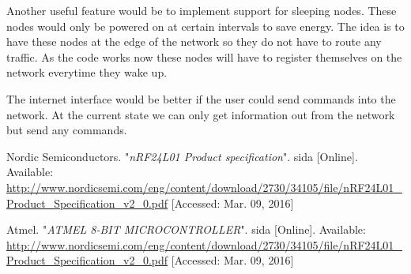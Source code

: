 \documentclass[a4paper,11pt]{article}
\begin{document}
Another useful feature would be to implement support for sleeping 
nodes. These nodes would only be powered on at certain intervals to
save energy. The idea is to have these nodes at the edge of the 
network so they do not have to route any traffic. As the code works
now these nodes will have to register themselves on the network
everytime they wake up. 

The internet interface would be better if the user could send commands
into the network. At the current state we can only get information out
from the network but send any commands.

\begin{thebibliography}{2}

  Nordic Semiconductors. "\emph{nRF24L01 Product specification}". sida [Online]. Available: \url{http://www.nordicsemi.com/eng/content/download/2730/34105/file/nRF24L01_Product_Specification_v2_0.pdf} [Accessed: Mar. 09, 2016]

  Atmel. "\emph{ATMEL 8-BIT MICROCONTROLLER}". sida [Online]. Available: \url{http://www.nordicsemi.com/eng/content/download/2730/34105/file/nRF24L01_Product_Specification_v2_0.pdf} [Accessed: Mar. 09, 2016]

\end{thebibliography}
\end{document}
